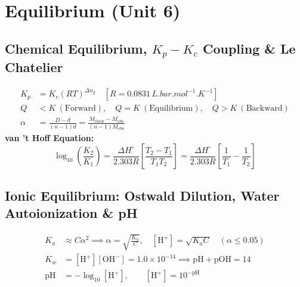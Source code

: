 \documentclass[10pt,twoside,openright]{book}
\begin{document}
\newpage

\section{Equilibrium (Unit 6)}

\subsection{Chemical Equilibrium, $K_p-K_c$ Coupling \& Le Chatelier}

\begin{formulabox}
\begin{align}
  K_p &= K_c (R T)^{\Delta n_g} \quad [R = 0.0831\,\si{L.bar.mol^{-1}.K^{-1}}] \\
  Q &< K \ (\text{Forward}), \quad Q = K \ (\text{Equilibrium}), \quad Q > K \ (\text{Backward}) \\
  \alpha &= \frac{D - d}{(n - 1)d} = \frac{M_{\text{theor}} - M_{\text{obs}}}{(n - 1)M_{\text{obs}}}
\end{align}
\textbf{van 't Hoff Equation:}
\begin{equation}
  \log_{10}\left(\frac{K_2}{K_1}\right) = \frac{\Delta H^\circ}{2.303 R}\left[\frac{T_2 - T_1}{T_1 T_2}\right] = \frac{\Delta H^\circ}{2.303 R}\left[\frac{1}{T_1} - \frac{1}{T_2}\right]
\end{equation}
\end{formulabox}

\subsection{Ionic Equilibrium: Ostwald Dilution, Water Autoionization \& pH}

\begin{formulabox}
\begin{align}
  K_a &\approx C \alpha^2 \implies \alpha = \sqrt{\frac{K_a}{C}}, \quad [\text{H}^+] = \sqrt{K_a C} \quad (\alpha \le 0.05) \\
  K_w &= [\text{H}^+][\text{OH}^-] = 1.0\times 10^{-14} \implies \text{pH} + \text{pOH} = 14 \\
  \text{pH} &= -\log_{10}[\text{H}^+], \qquad [\text{H}^+] = 10^{-\text{pH}}
\end{align}
\end{formulabox}
\end{document}
